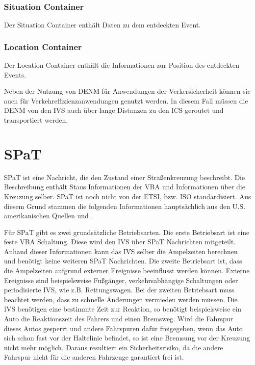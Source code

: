 \subsubsection{Situation Container}
Der Situation Container enthält Daten zu dem entdeckten Event.

\subsubsection{Location Container}
Der Location Container enthält die Informationen zur Position des entdeckten Events.



Neben der Nutzung von \ac{DENM} für Anwendungen der Verkersicherheit können sie auch für Verkehreffizienzanwendungen genutzt werden. In diesem Fall müssen die \ac{DENM} von den \ac{IVS} auch über lange Distanzen zu den \ac{ICS} geroutet und transportiert werden. 



\section{SPaT\label{sec:spat}}
\ac{SPaT} ist eine Nachricht, die den Zustand einer Straßenkreuzung beschreibt. Die Beschreibung enthält Staus Informationen der \ac{VBA} und Informationen über die Kreuzung selber. \ac{SPaT} ist noch nicht von der \ac{ETSI}, bzw. \ac{ISO} standardisiert. Aus diesem Grund stammen die folgenden Informationen hauptsächlich aus den U.S. amerikanischen Quellen \cite{usSpat} und \cite{usCaliforniaSpat}. 

Für \ac{SPaT} gibt es zwei grundsätzliche Betriebsarten. Die erste Betriebsart ist eine feste \ac{VBA} Schaltung. Diese wird den \ac{IVS} über \ac{SPaT} Nachrichten mitgeteilt. Anhand dieser Informationen kann das \ac{IVS} selber die Ampelzeiten berechnen und benötigt keine  weiteren \ac{SPaT} Nachrichten. Die zweite Betriebsart ist, dass die Ampelzeiten aufgrund externer Ereignisse beeinflusst werden können. Externe Ereignisse sind beispielsweise Fußgänger, verkehrsabhängige Schaltungen oder periodisierte \ac{IVS}, wie z.B. Rettungswagen. Bei der zweiten Betriebsart muss beachtet werden, dass zu schnelle Änderungen vermieden werden müssen. Die \ac{IVS} benötigen eine bestimmte Zeit zur Reaktion, so benötigt beispielsweise ein Auto die Reaktionszeit des Fahrers und einen Bremsweg. Wird die Fahrspur dieses Autos gesperrt und andere Fahrspuren dafür freigegeben, wenn das Auto sich schon fast vor der Haltelinie befindet, so ist eine Bremsung vor der Kreuzung nicht mehr möglich. Daraus resultiert ein Sicherheitsrisiko, da die andere Fahrspur nicht für die anderen Fahrzeuge garantiert frei ist. 

